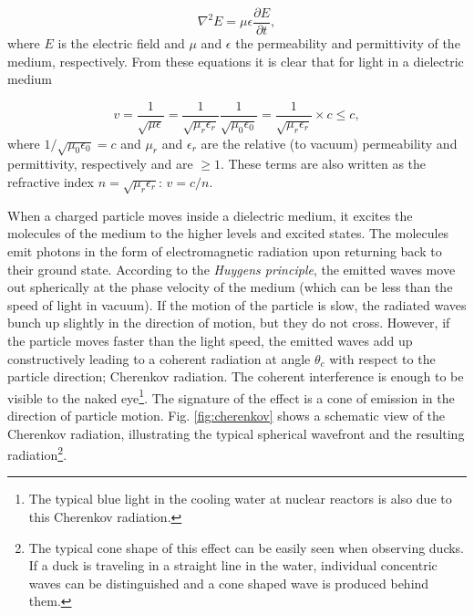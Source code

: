 \begin{equation}
\nabla^2E = \mu \epsilon \frac{\partial E}{\partial t},
\end{equation}
where $E$ is the electric field and $\mu$ and $\epsilon$ the permeability and permittivity of the medium, respectively. From these equations it is clear that for light in a dielectric medium

\begin{equation}
v = \frac{1}{\sqrt{\mu \epsilon}} = \frac{1}{\sqrt{\mu_r \epsilon_r}}\frac{1}{\sqrt{\mu_0 \epsilon_0}} = \frac{1}{\sqrt{\mu_r \epsilon_r}} \times c \leq c,
\end{equation}
where $1/\sqrt{\mu_0 \epsilon_0} = c$ and $\mu_r$ and $\epsilon_r$ are the relative (to vacuum) permeability and permittivity, respectively and are $\geq 1$. These terms are also written as the refractive index $n = \sqrt{\mu_r \epsilon_r}$: $v = c/n$.

When a charged particle moves inside a dielectric medium, it excites the molecules of the medium to the higher levels and excited states. The molecules emit photons in the form of electromagnetic radiation upon returning back to their ground state. According to the \textit{Huygens principle}, the emitted waves move out spherically at the phase velocity of the medium (which can be less than the speed of light in vacuum). If the motion of the particle is slow, the radiated waves bunch up slightly in the direction of motion, but they do not cross. However, if the particle moves faster than the light speed, the emitted waves add up constructively leading to a coherent radiation at angle $\theta_c$ with respect to the particle direction; Cherenkov radiation. The coherent interference is enough to be visible to the naked eye\footnote{The typical blue light in the cooling water at nuclear reactors is also due to this Cherenkov radiation.}. The signature of the effect is a cone of emission in the direction of particle motion. Fig. \ref{fig:cherenkov} shows a schematic view of the Cherenkov radiation, illustrating the typical spherical wavefront and the resulting radiation\footnote{The typical cone shape of this effect can be easily seen when observing ducks. If a duck is traveling in a straight line in the water, individual concentric waves can be distinguished and a cone shaped wave is produced behind them.}.

